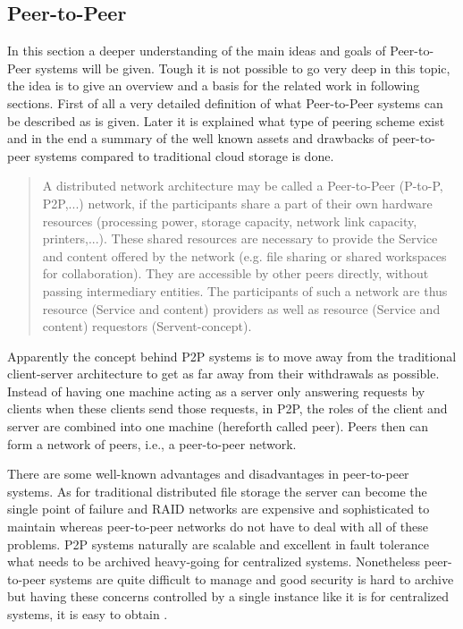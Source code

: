 \subsection{Peer-to-Peer}
In this section a deeper understanding of the main ideas and goals of Peer-to-Peer systems will be given. Tough it is not possible to go very deep in this topic, the idea is to give an overview and a basis for the related work in following sections. First of all a very detailed definition of what Peer-to-Peer systems can be described as is given. Later it is explained what type of peering scheme exist and in the end a summary of the well known assets and drawbacks of peer-to-peer systems compared to traditional cloud storage is done.
\begin{quote}
A distributed network architecture may be called a Peer-to-Peer (P-to-P, P2P,...) network, if the participants share a part of their own hardware resources (processing power, storage capacity, network link capacity, printers,...). These shared resources are necessary to provide the Service and content offered by the network (e.g. file sharing or shared workspaces for collaboration). They are accessible by other peers directly, without passing intermediary entities. The participants of such a network are thus resource (Service and content) providers as well as resource (Service and content) requestors (Servent-concept)\cite{ptp:definition}.
\end{quote}
Apparently the concept behind P2P systems is to move away from the traditional client-server architecture to get as far away from their withdrawals as possible. Instead of having one machine acting as a server only answering requests by clients when these clients send those requests, in P2P, the roles of the client and server are combined into one machine (hereforth called peer). Peers then can form a network of peers, i.e., a peer-to-peer network.

There are some well-known advantages and disadvantages in peer-to-peer systems. As for traditional distributed file storage the server can become the single point of failure and RAID networks are expensive and sophisticated to maintain whereas peer-to-peer networks do not have to deal with all of these problems. P2P systems naturally are scalable and excellent in fault tolerance what needs to be archived heavy-going for centralized systems. Nonetheless peer-to-peer systems are quite difficult to manage and good security is hard to archive but having these concerns controlled by a single instance like it is for centralized systems, it is easy to obtain \cite{tomp2p:p2p_introduction}.

